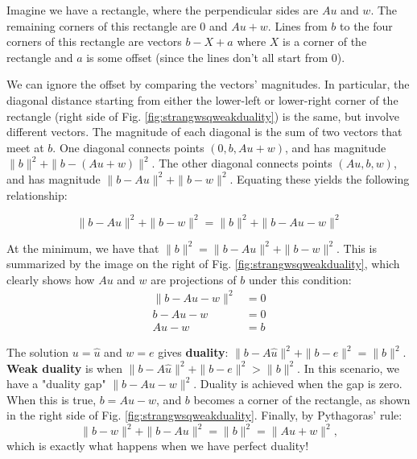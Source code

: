 \documentclass[]{article}
\begin{document}
Imagine we have a rectangle, where the perpendicular sides are $Au$ and $w$. The remaining corners of this rectangle are $0$ and $Au + w$. Lines from $b$ to the four corners of this rectangle are vectors $b - X + a$ where $X$ is a corner of the rectangle and $a$ is some offset (since the lines don't all start from 0). 

We can ignore the offset by comparing the vectors' magnitudes. In particular, the diagonal distance starting from either the lower-left or lower-right corner of the rectangle (right side of Fig. \ref{fig:strangwsqweakduality}) is the same, but involve different vectors. The magnitude of each diagonal is the sum of two vectors that meet at $b$. One diagonal connects points $(0, b, Au + w)$, and has magnitude $\parallel b \parallel^2 + \parallel b - (Au + w) \parallel^2$. The other diagonal connects points $(Au, b, w)$, and has magnitude $\parallel b - Au \parallel^2 + \parallel b - w \parallel^2$. Equating these yields the following relationship:

\begin{equation}
\parallel b - Au \parallel^2 + \parallel b-w \parallel^2 = \parallel b \parallel^2 + \parallel b - Au - w \parallel^2 
\end{equation}

At the minimum, we have that $\parallel b \parallel^2 = \parallel b - Au \parallel^2 + \parallel b-w \parallel^2$. This is summarized by the image on the right of Fig. \ref{fig:strangwsqweakduality}, which clearly shows how $Au$ and $w$ are projections of $b$ under this condition:
\begin{align}
\parallel b - Au - w \parallel^2 &= 0 \\
b - Au - w &= 0 \\
Au - w &= b 
\end{align}

The solution $u = \hat{u}$ and $w = e$ gives \textbf{duality}: $\parallel b - A\hat{u} \parallel^2 + \parallel b-e \parallel^2 = \parallel b \parallel^2$. \textbf{Weak duality} is when $\parallel b - A\hat{u} \parallel^2 + \parallel b-e \parallel^2 > \parallel b \parallel^2$. In this scenario, we have a "duality gap" $\parallel b - Au - w \parallel^2$. Duality is achieved when the gap is zero. When this is true, $b = Au - w$, and $b$ becomes a corner of the rectangle, as shown in the right side of Fig. \ref{fig:strangwsqweakduality}. Finally, by Pythagoras' rule: 
\begin{equation}
\parallel b-w \parallel^2 + \parallel b-Au \parallel^2 = \parallel b \parallel^2 = \parallel Au + w \parallel^2,
\end{equation}
which is exactly what happens when we have perfect duality! 
\end{document}
